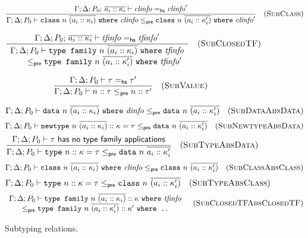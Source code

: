 \begin{figure}
\[
\frac{
\Gamma; \Delta; P_0;\, \overline{a_i :: \kappa_i} \vdash \mathit{clinfo} =_\textsf{hs} \mathit{clinfo}'
}{
\Gamma; \Delta; P_0 \vdash \texttt{class}~n~\overline{(a_i :: \kappa_i)} ~\texttt{where}~ \mathit{clinfo} \le_\textsf{pre} \texttt{class}~n~\overline{(a_i :: \kappa'_i)} ~\texttt{where}~ \mathit{clinfo}'
}
\quad(\textsc{SubClass})
\]

\[
\frac{
\Gamma; \Delta; P_0;\, \overline{a_i :: \kappa_i} \vdash \mathit{tfinfo} =_\textsf{hs} \mathit{tfinfo}'
}{
\begin{array}{l}
\Gamma; \Delta; P_0 \vdash \texttt{type family}~n~\overline{(a_i :: \kappa_i)} ~\texttt{where}~ \mathit{tfinfo}
\\ \qquad \le_\textsf{pre} \texttt{type family}~n~\overline{(a_i :: \kappa'_i)} ~\texttt{where}~ \mathit{tfinfo}'
\end{array}
}
\quad(\textsc{SubClosedTF})
\]

\[
\frac{
\Gamma; \Delta; P_0 \vdash \tau =_\textsf{hs} \tau'
}{
\Gamma; \Delta; P_0 \vdash n :: \tau \le_\textsf{pre} n :: \tau'
}
\quad(\textsc{SubValue})
\]


\begin{mdframed}
\[
\Gamma; \Delta; P_0 \vdash \texttt{data}~n~\overline{(a_i :: \kappa_i)} ~\texttt{where}~ \mathit{dinfo} \le_\textsf{pre} \texttt{data}~n~\overline{(a_i :: \kappa'_i)}
\quad(\textsc{SubDataAbsData})
\]
\[
\Gamma; \Delta; P_0 \vdash \texttt{newtype}~n~\overline{(a_i :: \kappa_i)} :: \kappa = \tau \le_\textsf{pre} \texttt{data}~n~\overline{(a_i :: \kappa'_i)}
\quad(\textsc{SubNewtypeAbsData})
\]
\[
\frac{
\Gamma; \Delta; P_0 \vdash \tau ~\textsf{has no type family applications}
}{
\Gamma; \Delta; P_0 \vdash \texttt{type}~n :: \kappa = \tau \le_\textsf{pre} \texttt{data}~n~\overline{a_i :: \kappa'_i}
}
\quad(\textsc{SubTypeAbsData})
\]
\[
\Gamma; \Delta; P_0 \vdash \texttt{class}~n~\overline{(a_i :: \kappa_i)}~\texttt{where}~ \mathit{clinfo} \le_\textsf{pre} \texttt{class}~n~\overline{(a_i :: \kappa'_i)}
\quad(\textsc{SubClassAbsClass})
\]
\[
\Gamma; \Delta; P_0 \vdash \texttt{type}~n :: \kappa = \tau \le_\textsf{pre} \texttt{class}~n~\overline{(a_i :: \kappa'_i)}
\quad(\textsc{SubTypeAbsClass})
\]
\[
\begin{array}{c}
\Gamma; \Delta; P_0 \vdash \texttt{type family}~n~\overline{(a_i :: \kappa_i)} :: \kappa ~\texttt{where}~ \mathit{tfinfo} \\
\le_\textsf{pre} \texttt{type family}~n~\overline{(a_i :: \kappa'_i)} :: \kappa' ~\texttt{where ..}
\end{array}
\quad(\textsc{SubClosedTFAbsClosedTF})
\]
\end{mdframed}
\caption{Subtyping relations.}
\label{typing:subtyping}
\end{figure}
